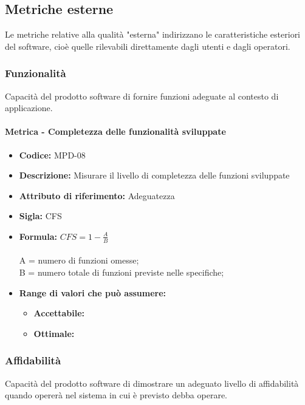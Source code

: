  
           
\subsection{Metriche esterne}
Le metriche relative alla qualità "esterna" indirizzano le caratteristiche esteriori del software, cioè quelle rilevabili direttamente dagli utenti e dagli operatori.
   \subsubsection{Funzionalità}
   Capacità del prodotto software di fornire funzioni adeguate al contesto di applicazione.
   
      

                   \paragraph{Metrica - Completezza delle funzionalità sviluppate} 
            \begin{itemize}
            \item  \textbf{Codice:} MPD-08
            \item  \textbf{Descrizione:} Misurare il livello di completezza delle funzioni sviluppate 
            \item  \textbf{Attributo di riferimento:} Adeguatezza
            \item  \textbf{Sigla:} CFS
            \item  \textbf{Formula:} \begin{math}CFS = 1- \frac{A}{B}\end{math}\\ \\
            A = numero di funzioni omesse;\\
            B = numero totale di funzioni previste nelle specifiche;
            \item \textbf{Range di valori che può assumere:}
        \begin{itemize}
            \item \textbf{Accettabile:} 
            \item \textbf{Ottimale:} 
        \end{itemize}
       \end{itemize}
       
             
       
              
          \subsubsection{Affidabilità}
   Capacità del prodotto software di dimostrare un adeguato livello di affidabilità quando opererà nel sistema in cui è previsto debba operare.
   
